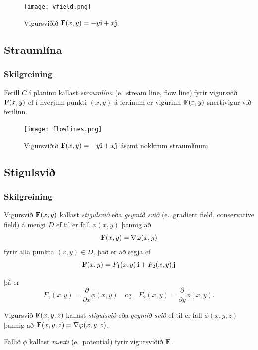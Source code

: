  \begin {figure}[h!]
 \centering
            \texttt{[image: vfield.png]}
            \caption*{ Vigursviðið $\mathbf{F}(x,y) = -y\mbox{${\bf i}$} + x \mbox{${\bf j}$}$.}
\end {figure}






\subsection{Straumlína} 

\subsubsection{Skilgreining }
 Ferill $C$ í planinu kallast {\em straumlína}
(e.~stream line, flow line)
fyrir vigursvið $\mbox{${\bf F}$}(x,y)$ ef í hverjum punkti $(x,y)$ á ferlinum er
vigurinn $\mbox{${\bf F}$}(x,y)$ snertivigur við ferilinn. 


 \begin {figure}[h!]
 \centering
            \texttt{[image: flowlines.png]}
            \caption*{Vigursviðið $\mathbf{F}(x,y) = -y\mbox{${\bf i}$} + x \mbox{${\bf j}$}$ ásamt nokkrum straumlínum.}
\end {figure}




\subsection{Stigulsvið} 

\subsubsection{Skilgreining }
Vigursvið $\mbox{${\bf F}$}(x,y)$ kallast {\em stigulsvið} eða {\em geymið svið}
(e.~gradient field, conservative  field) á mengi $D$ ef til er fall $\phi(x,y)$ þannig að $$\mbox{${\bf F}$}(x,y)=\nabla\varphi(x,y)$$ fyrir alla punkta $(x,y)\in D$, það er að segja ef 
$$\mbox{${\bf F}$}(x,y)=F_1(x,y)\,\mbox{${\bf i}$}+F_2(x,y)\,\mbox{${\bf j}$}$$ 

þá er $$F_1(x,y)=\frac{\partial}{\partial x}\phi(x,y) \quad \text{og}\quad  F_2(x,y)=\frac{\partial}{\partial y}\phi(x,y).$$

Vigursvið $\mbox{${\bf F}$}(x,y,z)$ kallast {\em stigulsvið} eða  {\em geymið svið} ef til er fall $\phi(x,y,z)$ þannig að $\mbox{${\bf F}$}(x,y,z)=\nabla\varphi(x,y,z)$. 

\medskip
Fallið $\phi$ kallast {\em mætti} (e.~potential) fyrir vigursviðið $\mbox{${\bf F}$}$.




